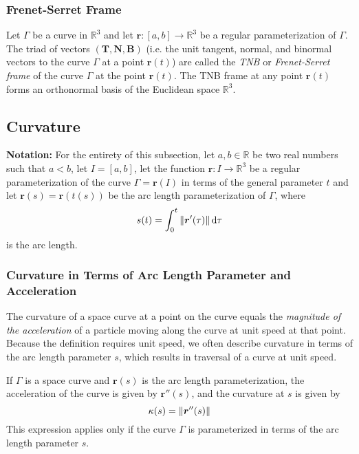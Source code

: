 \documentclass[11pt, a4paper]{article}
\newcommand{\diff}{\mathop{}\!\mathrm{d}} %
\begin{document}
\subsubsection{Frenet-Serret Frame}
Let $ \Gamma $ be a curve in $ \mathbb{R}^3 $ and let $ \bm{r} : [a, b] \rightarrow \mathbb{R}^3 $ be a regular parameterization of $ \Gamma $. The triad of vectors $ (\mathbf{T}, \mathbf{N}, \mathbf{B}) $ (i.e. the unit tangent, normal, and binormal vectors to the curve $ \Gamma $ at a point $ \bm{r}(t) $) are called the \textit{TNB} or \textit{Frenet-Serret frame} of the curve $ \Gamma $ at the point $ \bm{r}(t) $. The TNB frame at any point $ \bm{r}(t) $ forms an orthonormal basis of the Euclidean space $ \mathbb{R}^3 $.

\subsection{Curvature}
\textbf{Notation:} For the entirety of this subsection, let $ a, b \in \mathbb{R} $ be two real numbers such that $ a < b $, let $ I = [a, b] $, let the function $ \bm{r} : I \rightarrow \mathbb{R}^3 $ be a regular parameterization of the curve $ \Gamma = \bm{r}(I) $ in terms of the general parameter $ t $ and let $ \bm{r}(s) = \bm{r}(t(s)) $ be the arc length parameterization of $ \Gamma $, where
\begin{equation*}
	s(t) = \int_{0}^{t} \norm{\bm{r}'(\tau)} \diff \tau
\end{equation*}
is the arc length.
	
\subsubsection{Curvature in Terms of Arc Length Parameter and Acceleration}
The curvature of a space curve at a point on the curve equals the \textit{magnitude of the acceleration} of a particle moving along the curve at unit speed at that point. Because the definition requires unit speed, we often describe curvature in terms of the arc length parameter $ s $, which results in traversal of a curve at unit speed.

If $ \Gamma $ is a space curve and $ \bm{r}(s) $ is the arc length parameterization, the acceleration of the curve is given by $ \bm{r}''(s) $, and the curvature at $ s $ is given by
\begin{equation*}
	\kappa(s) = \norm{ \bm{r}''(s)}
\end{equation*}
This expression applies only if the curve $ \Gamma $ is parameterized in terms of the arc length parameter $ s $.
\end{document}
